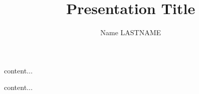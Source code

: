 \documentclass{beamer}
\author{Name LASTNAME}
\date{}
\institute{Etalab}
\title{Presentation Title}
\subtitle{}
\begin{document}
	
	\maketitle
	
	\begin{frame}
	content...
	\end{frame}

	\begin{frame}
	content...
	\end{frame}
\end{document}
